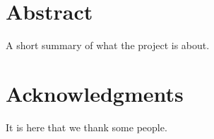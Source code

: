 \chapter*{Abstract}

A short summary of what the project is about.



\chapter*{Acknowledgments}

It is here that we thank some people.

